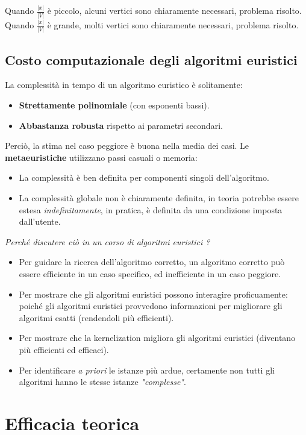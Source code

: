\documentclass{article}
\begin{document}
Quando $\frac{|x|}{|V|}$ è piccolo, alcuni vertici sono chiaramente necessari, problema risolto.
Quando $\frac{|x|}{|V|}$ è grande, molti vertici sono chiaramente necessari, problema risolto.

\subsection{Costo computazionale degli algoritmi euristici}
La complessità in tempo di un algoritmo euristico è solitamente:
\begin{itemize}
    \item \textbf{Strettamente polinomiale} (con esponenti bassi).
    \item \textbf{Abbastanza robusta} rispetto ai parametri secondari.
\end{itemize}
Perciò, la stima nel caso peggiore è buona nella media dei casi.
Le \textbf{metaeuristiche} utilizzano passi casuali o memoria:
\begin{itemize}
    \item La complessità è ben definita per componenti singoli dell'algoritmo.
    \item La complessità globale non è chiaramente definita, in teoria potrebbe
          essere estesa \textit{indefinitamente}, in pratica, è definita da una
          condizione imposta dall'utente.
\end{itemize}

\noindent\textit{Perché discutere ciò in un corso di algoritmi euristici ?}
\begin{itemize}
    \item Per guidare la ricerca dell'algoritmo corretto, un algoritmo corretto
          può essere efficiente in un caso specifico, ed inefficiente in un caso peggiore.
    \item Per mostrare che gli algoritmi euristici possono interagire proficuamente:
          poiché gli algoritmi euristici provvedono informazioni per migliorare gli algoritmi
          esatti (rendendoli più efficienti).
    \item Per mostrare che la kernelization migliora gli algoritmi euristici (diventano più efficienti
          ed efficaci).
    \item Per identificare \textit{a priori} le istanze più ardue, certamente non tutti
          gli algoritmi hanno le stesse istanze \textit{"complesse"}.
\end{itemize}

\section{Efficacia teorica}
\end{document}
